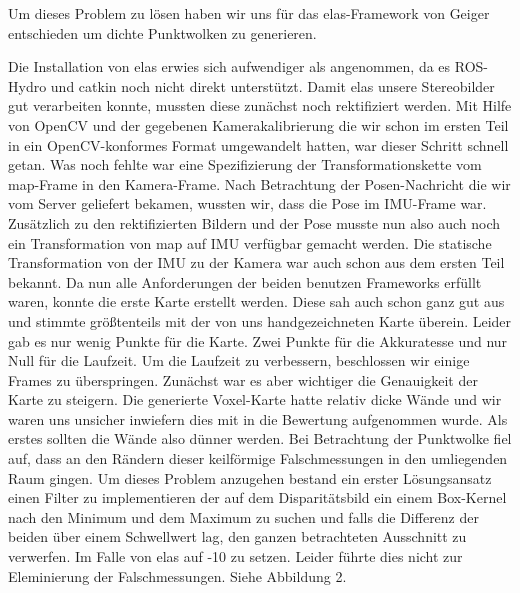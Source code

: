 \documentclass[12pt,titlepage, a4paper]{article}
\begin{document}
Um dieses Problem zu lösen haben wir uns für das elas-Framework von Geiger entschieden um dichte Punktwolken zu generieren.

Die Installation von elas erwies sich aufwendiger als angenommen, da es ROS-Hydro und catkin noch nicht direkt unterstützt. Damit elas unsere Stereobilder gut verarbeiten konnte, mussten diese zunächst noch rektifiziert werden. Mit Hilfe von OpenCV und der gegebenen Kamerakalibrierung die wir schon im ersten Teil in ein OpenCV-konformes Format umgewandelt hatten, war dieser Schritt schnell getan. Was noch fehlte war eine Spezifizierung der Transformationskette vom map-Frame in den Kamera-Frame. Nach Betrachtung der Posen-Nachricht die wir vom Server geliefert bekamen, wussten wir, dass die Pose im IMU-Frame war. Zusätzlich zu den rektifizierten Bildern und der Pose musste nun also auch noch ein Transformation von map auf IMU verfügbar gemacht werden. Die statische Transformation von der IMU zu der Kamera war auch schon aus dem ersten Teil bekannt. Da nun alle Anforderungen der beiden benutzen Frameworks erfüllt waren, konnte die erste Karte erstellt werden. Diese sah auch schon ganz gut aus und stimmte größtenteils mit der von uns handgezeichneten Karte überein. Leider gab es nur wenig Punkte für die Karte. Zwei Punkte für die Akkuratesse und nur Null für die Laufzeit. Um die Laufzeit zu verbessern, beschlossen wir einige Frames zu überspringen. Zunächst war es aber wichtiger die Genauigkeit der Karte zu steigern. Die generierte Voxel-Karte hatte relativ dicke Wände und wir waren uns unsicher inwiefern dies mit in die Bewertung aufgenommen wurde. Als erstes sollten die Wände also dünner werden. Bei Betrachtung der Punktwolke fiel auf, dass an den Rändern dieser keilförmige Falschmessungen in den umliegenden Raum gingen. Um dieses Problem anzugehen bestand ein erster Lösungsansatz einen Filter zu implementieren der auf dem Disparitätsbild ein einem Box-Kernel nach den Minimum und dem Maximum zu suchen und falls die Differenz der beiden über einem Schwellwert lag, den ganzen betrachteten Ausschnitt zu verwerfen. Im Falle von elas auf -10 zu setzen. Leider führte dies nicht zur Eleminierung der Falschmessungen. Siehe Abbildung 2.
\end{document}
